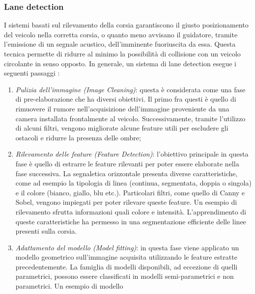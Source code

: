 \subsubsection{Lane detection}
I sistemi basati sul rilevamento della corsia garantiscono il giusto posizionamento 
del veicolo nella corretta corsia, o quanto meno avvisano il guidatore, 
tramite l'emissione di un segnale acustico, dell'imminente fuoriuscita 
da essa. Questa tecnica permette di ridurre al minimo la possibilità di 
collisione con un veicolo circolante in senso opposto. In generale, un sistema 
di lane detection esegue i seguenti passaggi \cite{lane-steps}:
\begin{enumerate}
    \item \emph{Pulizia dell'immagine (Image Cleaning)}: questa è considerata come 
    una fase di pre-elaborazione che ha diversi obiettivi. Il primo fra 
    questi è quello di rimuovere il rumore nell'acquisizione dell'immagine 
    proveniente da una camera installata frontalmente al veicolo. Successivamente, 
    tramite l'utilizzo di alcuni filtri, vengono migliorate alcune 
    feature utili per escludere gli ostacoli e ridurre la presenza delle ombre;
    \item \emph{Rilevamento delle feature (Feature Detection)}: l'obiettivo principale 
    in questa fase è quello di estrarre le feature rilevanti per poter essere 
    elaborate nella fase successiva. La segnaletica orizzontale presenta 
    diverse caratteristiche, come ad esempio la tipologia di linea (continua, 
    segmentata, doppia o singola) e il colore (bianco, giallo, blu etc.). Particolari 
    filtri, come quello di Canny e Sobel, vengono impiegati per poter 
    rilevare queste feature. Un esempio di rilevamento sfrutta informazioni 
    quali colore e intensità. L'apprendimento di queste caratteristiche ha 
    permesso in \cite{lane-detection} una segmentazione efficiente delle linee presenti sulla 
    corsia.
    \item \emph{Adattamento del modello (Model fitting)}: in questa fase viene applicato 
    un modello geometrico sull'immagine acquisita utilizzando le 
    feature estratte precedentemente. La famiglia di modelli disponibili, 
    ad eccezione di quelli parametrici, possono essere classificati in 
    modelli semi-parametrici e non parametrici. Un esempio di modello 

\end{enumerate}
